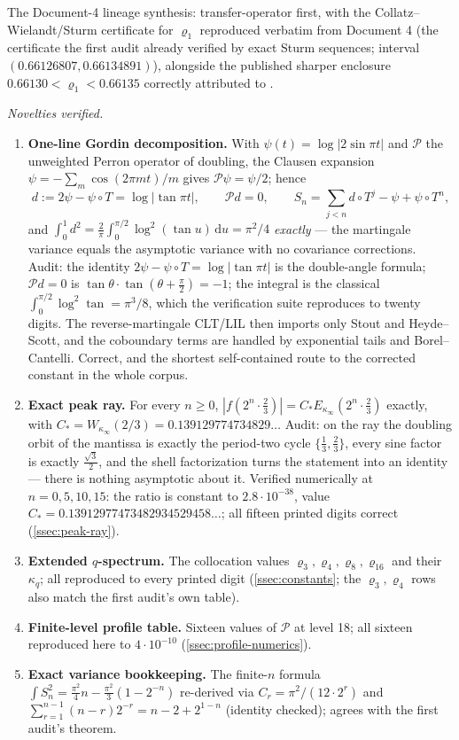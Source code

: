 \documentclass[11pt,oneside]{article}
\theoremstyle{definition}
\theoremstyle{remark}
\newcommand{\dd}{\,\mathrm d}
\newcommand{\T}{T}
\begin{document}
The Document-4 lineage synthesis: transfer-operator first, with the
Collatz--Wielandt/Sturm certificate for $\varrho_1$ reproduced verbatim
from Document 4 (the certificate the first audit already verified by
exact Sturm sequences; interval $(0.66126807,0.66134891)$), alongside
the published sharper enclosure $0.66130<\varrho_1<0.66135$ correctly
attributed to \cite{ahl2017}.

\emph{Novelties verified.}
\begin{enumerate}
\item \textbf{One-line Gordin decomposition.}  With
$\psi(t)=\log|2\sin\pi t|$ and $\mathcal P$ the unweighted Perron
operator of doubling, the Clausen expansion
$\psi=-\sum_m\cos(2\pi mt)/m$ gives $\mathcal P\psi=\psi/2$; hence
\[
 d:=2\psi-\psi\circ\T=\log|\tan\pi t|,
 \qquad
 \mathcal Pd=0,
 \qquad
 S_n=\sum_{j<n}d\circ\T^j-\psi+\psi\circ\T^n,
\]
and $\int_0^1d^2=\frac2\pi\int_0^{\pi/2}\log^2(\tan u)\dd u=\pi^2/4$
\emph{exactly} --- the martingale variance equals the asymptotic
variance with no covariance corrections.  Audit: the identity
$2\psi-\psi\circ\T=\log|\tan\pi t|$ is the double-angle formula;
$\mathcal Pd=0$ is $\tan\theta\cdot\tan(\theta+\frac\pi2)=-1$; the
integral is the classical $\int_0^{\pi/2}\log^2\tan=\pi^3/8$, which the
verification suite reproduces to twenty digits.  The reverse-martingale
CLT/LIL then imports only Stout and Heyde--Scott, and the coboundary
terms are handled by exponential tails and Borel--Cantelli.  Correct,
and the shortest self-contained route to the corrected constant in the
whole corpus.
\item \textbf{Exact peak ray.}  For every $n\ge0$,
$|f(2^n\cdot\frac23)|=C_*E_{\kappa_\infty}(2^n\cdot\frac23)$ exactly,
with $C_*=W_{\kappa_\infty}(2/3)=0.139129774734829\ldots$  Audit: on
the ray the doubling orbit of the mantissa is exactly the period-two
cycle $\{\frac13,\frac23\}$, every sine factor is exactly
$\frac{\sqrt3}2$, and the shell factorization turns the statement into
an identity --- there is nothing asymptotic about it.  Verified
numerically at $n=0,5,10,15$: the ratio is constant to $2.8\cdot10^{-38}$,
value $C_*=0.13912977473482934529458\ldots$; all fifteen printed digits
correct (\cref{ssec:peak-ray}).
\item \textbf{Extended $q$-spectrum.}  The collocation values
$\varrho_3,\varrho_4,\varrho_8,\varrho_{16}$ and their $\kappa_q$;
all reproduced to every printed digit (\cref{ssec:constants}; the
$\varrho_3,\varrho_4$ rows also match the first audit's own table).
\item \textbf{Finite-level profile table.}  Sixteen values of
$\mathscr P$ at level 18; all sixteen reproduced here to
$4\cdot10^{-10}$ (\cref{ssec:profile-numerics}).
\item \textbf{Exact variance bookkeeping.}  The finite-$n$ formula
$\int S_n^2=\frac{\pi^2}4n-\frac{\pi^2}3(1-2^{-n})$ re-derived via
$C_r=\pi^2/(12\cdot2^r)$ and
$\sum_{r=1}^{n-1}(n-r)2^{-r}=n-2+2^{1-n}$ (identity checked); agrees
with the first audit's theorem.
\end{enumerate}
\end{document}
